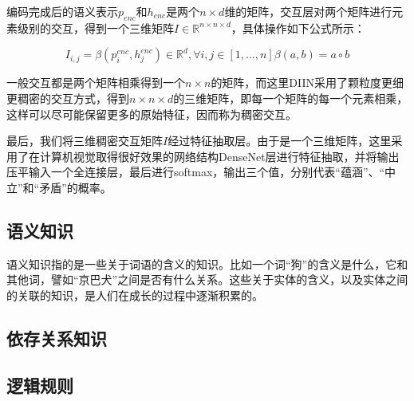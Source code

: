 \documentclass[UTF8,11pt,a4paper,nofonts]{ctexart}
\begin{document}
编码完成后的语义表示$p_{enc}$和$h_{enc}$是两个$n\times d$维的矩阵，交互层对两个矩阵进行元素级别的交互，得到一个三维矩阵$I \in \mathbb{R}^{n\times n \times d}$，具体操作如下公式所示：

\begin{equation}
I_{i,j} = \beta(p^{enc}_i, h^{enc}_j) \in \mathbb{R}^d, \forall i, j \in [1,\dots,n]

\beta(a, b) = a \circ b
\end{equation}

一般交互都是两个矩阵相乘得到一个$n\times n$的矩阵，而这里DIIN采用了颗粒度更细更稠密的交互方式，得到$n\times n \times d$的三维矩阵，即每一个矩阵的每一个元素相乘，这样可以尽可能保留更多的原始特征，因而称为稠密交互。

最后，我们将三维稠密交互矩阵$I$经过特征抽取层。由于是一个三维矩阵，这里采用了在计算机视觉取得很好效果的网络结构DenseNet层\cite{}进行特征抽取，并将输出压平输入一个全连接层，最后进行softmax，输出三个值，分别代表“蕴涵”、“中立”和“矛盾”的概率。



\subsection{语义知识}

语义知识指的是一些关于词语的含义的知识。比如一个词“狗”的含义是什么，它和其他词，譬如“京巴犬”之间是否有什么关系。这些关于实体的含义，以及实体之间的关联的知识，是人们在成长的过程中逐渐积累的。






\subsection{依存关系知识}


\subsection{逻辑规则}
\end{document}
